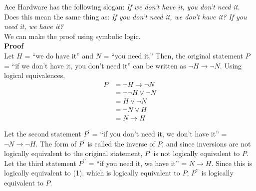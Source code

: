 \documentclass{article}
\begin{document}
Ace Hardware has the following slogan: \textit{If we don't have it, you don't need it.} Does this mean the same thing as: \textit{If you don't need it, we don't have it? If you need it, we have it?}\\ 

We can make the proof using symbolic logic.\\

\textbf{Proof}\\
Let $H$ = ``we do have it'' and $N$ = ``you need it.'' Then, the original statement $P$ = ``if we don't have it, you don't need it'' can be written as $\neg H \rightarrow \neg N$. Using logical equivalences,
\begin{align}
P &= \neg H \rightarrow \neg N \nonumber \\
&= \neg\neg H \vee \neg N \nonumber \\
&= H \vee \neg N \nonumber \\
&= \neg N \vee H \nonumber \\
&= N \rightarrow H
\end{align}

Let the second statement $P^\prime$ = ``if you don't need it, we don't have it'' = $\neg N \rightarrow \neg H$. The form of $P^\prime$ is called the inverse of $P$, and since inversions are not logically equivalent to the original statement, $P^\prime$ is not logically equivalent to $P$.\\

Let the third statement $P^{\prime\prime}$ = ``if you need it, we have it'' = $N \rightarrow H$. Since this is logically equivalent to (1), which is logically equivalent to $P$, $P^{\prime\prime}$ is logically equivalent to $P$.
\end{document}
